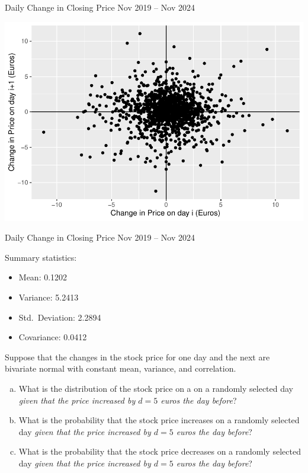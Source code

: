 \begin{frame}
  \begin{block}{Daily Change in Closing Price Nov 2019 -- Nov 2024}
    \begin{center}
       \includegraphics[height=.7\textheight]{figure/plot4-1}
    \end{center}
  \end{block}
\end{frame}

\begin{frame}
  \begin{block}{Daily Change in Closing Price Nov 2019 -- Nov 2024}
    
    Summary statistics:
    \begin{itemize}
    \item Mean: 0.1202
    \item Variance: 5.2413
    \item Std.~Deviation: 2.2894
    \item Covariance: 0.0412
    \end{itemize}
  \end{block}
\end{frame}

\begin{frame}

  \begin{block}{\example}
     Suppose that the changes in the stock price for one day and the next are bivariate normal with constant mean, variance, and correlation.  
 
    \begin{enumerate}[a)]
    \item What is the distribution of the stock price on a on a randomly selected day \textit{given that the price increased by $d=5$ euros the day before}?
    \item What is the probability that the stock price increases on a randomly selected day \textit{given that the price increased by $d=5$ euros the day before}?
    \item What is the probability that the stock price decreases on a randomly selected day \textit{given that the price increased by $d=5$ euros the day before}?
    \end{enumerate}
  \end{block}
\end{frame}

